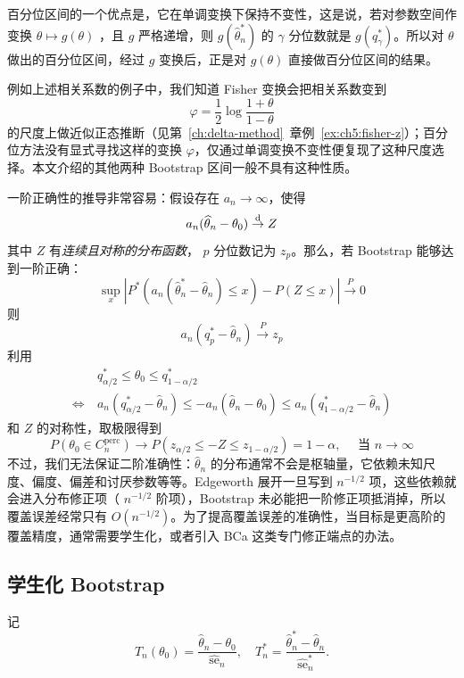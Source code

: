 百分位区间的一个优点是，它在单调变换下保持不变性，这是说，若对参数空间作变换 $\theta\mapsto g(\theta)$ ，且 $g$ 严格递增，则 $g(\widehat\theta_n^*)$ 的 $\gamma$ 分位数就是 $g(q_\gamma^*)$。所以对 $\theta$ 做出的百分位区间，经过 $g$ 变换后，正是对 $g(\theta)$ 直接做百分位区间的结果。

例如上述相关系数的例子中，我们知道 Fisher 变换会把相关系数变到
\[\varphi=\frac12\log\frac{1+\theta}{1-\theta}\]
的尺度上做近似正态推断（见第~\ref{ch:delta-method}~章例~\ref{ex:ch5:fisher-z}）；百分位方法没有显式寻找这样的变换 $\varphi$，仅通过单调变换不变性便复现了这种尺度选择。本文介绍的其他两种 Bootstrap 区间一般不具有这种性质。

一阶正确性的推导非常容易：假设存在 $a_n\to\infty$，使得
\[a_n(\widehat\theta_n-\theta_0)\overset{\rm d}\to Z\]
其中 $Z$ 有\emph{连续且对称的分布函数}， $p$ 分位数记为 $z_p$。那么，若 Bootstrap 能够达到一阶正确：
\[\sup_x\left| P^*(a_n(\widehat\theta_n^*-\widehat\theta_n)\le x) -P(Z\le x) \right|\overset{P}\to 0\]
则
\[a_n(q_p^*-\widehat\theta_n)\overset{P}\to z_p\]
利用
\[\begin{aligned}  &q_{\alpha/2}^*\le \theta_0\le q_{1-\alpha/2}^*\\ \iff\ & a_n(q_{\alpha/2}^*-\widehat\theta_n) \le -a_n(\widehat\theta_n-\theta_0) \le a_n(q_{1-\alpha/2}^*-\widehat\theta_n)\end{aligned}\]
和 $Z$ 的对称性，取极限得到
\[P(\theta_0\in C_n^{\mathrm{perc}})\to P(z_{\alpha/2}\le -Z\le z_{1-\alpha/2}) =1-\alpha,\quad \text{ 当 }n\to\infty\]
不过，我们无法保证二阶准确性：$\widehat\theta_n$ 的分布通常不会是枢轴量，它依赖未知尺度、偏度、偏差和讨厌参数等等。Edgeworth 展开一旦写到 $n^{-1/2}$ 项，这些依赖就会进入分布修正项（ $n^{-1/2}$ 阶项），Bootstrap 未必能把一阶修正项抵消掉，所以覆盖误差经常只有 $O(n^{-1/2})$。为了提高覆盖误差的准确性，当目标是更高阶的覆盖精度，通常需要学生化，或者引入 BCa 这类专门修正端点的办法。

\subsection{学生化 Bootstrap}

记
\[
T_n(\theta_0) =\frac{\widehat\theta_n-\theta_0}{\widehat{\mathrm{se}}_n},\quad T_n^* =\frac{\widehat\theta_n^*-\widehat\theta_n} {\widehat{\mathrm{se}}_n^*}.
\]

